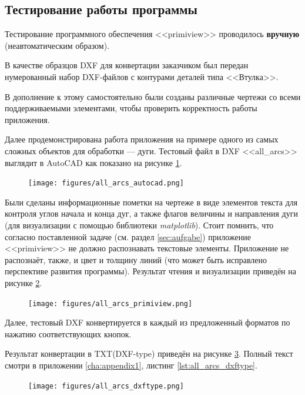 \subsection{Тестирование работы программы}

Тестирование программного обеспечения <<primiview>> проводилось \textbf{вручную} (неавтоматическим образом).

В качестве образцов DXF для конвертации заказчиком был передан нумерованный набор DXF-файлов с контурами деталей типа <<Втулка>>.

В дополнение к этому самостоятельно были созданы различные чертежи со всеми поддерживаемыми элементами, чтобы проверить корректность работы приложения.

Далее продемонстрирована работа приложения на примере одного из самых сложных объектов для обработки --- дуги. Тестовый файл в DXF <<all\_arcs>> выглядит в AutoCAD как показано на рисунке \ref{fig:all_arcs_autocad}.

\begin{figure}[H]
	\centering
	\texttt{[image: figures/all\_arcs\_autocad.png]}
	\label{fig:all_arcs_autocad}
\end{figure}

Были сделаны информационные пометки на чертеже в виде элементов текста для контроля углов начала и конца дуг, а также флагов величины и направления дуги (для визуализации с помощью библиотеки \textit{matplotlib}). Стоит помнить, что согласно поставленной задаче (см. раздел \ref{sec:aufgabe}) приложение <<primiview>> не должно распознавать текстовые элементы. Приложение не распознаёт, также, и цвет и толщину линий (что может быть исправлено перспективе развития программы). Результат чтения и визуализации приведён на рисунке \ref{fig:all_arcs_primiview}.

\begin{figure}[H]
	\centering
	\texttt{[image: figures/all\_arcs\_primiview.png]}
	\label{fig:all_arcs_primiview}
\end{figure}

Далее, тестовый DXF конвертируется в каждый из предложенный форматов по нажатию соответствующих кнопок.

Результат конвертации в TXT(DXF-type) приведён на рисунке \ref{fig:all_arcs_dxftype}. Полный текст смотри в приложении \ref{cha:appendix1}, листинг \ref{lst:all_arcs_dxftype}.

\begin{figure}[H]
	\centering
	\texttt{[image: figures/all\_arcs\_dxftype.png]}
	\label{fig:all_arcs_dxftype}
\end{figure}

